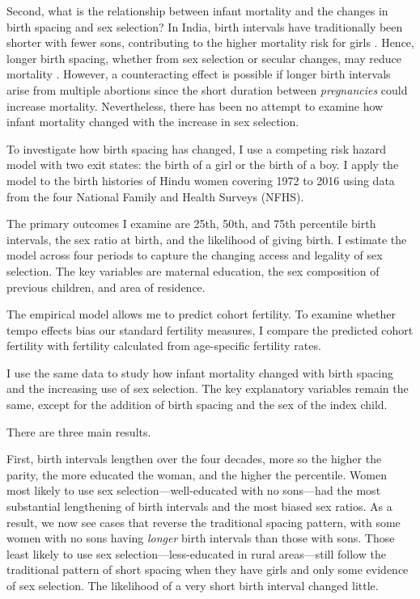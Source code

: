 \documentclass[12pt,letterpaper]{article}
\begin{document}
Second, what is the relationship between infant mortality and the changes in birth spacing 
and sex selection?
In India, birth intervals have traditionally been shorter with fewer sons, contributing 
to the higher mortality risk for girls
\citep{Whitworth2002,Bhalotra2008,Maitra2008,Jayachandran2011,Jayachandran2017a}.
Hence, longer birth spacing, whether from sex selection or secular changes, may reduce 
mortality \citep{Conde-Agudelo2012,Molitoris2019}.
However, a counteracting effect is possible if longer birth intervals arise from multiple 
abortions since the short duration between \emph{pregnancies} could increase mortality. 
Nevertheless, there has been no attempt to examine how infant mortality changed with 
the increase in sex selection.


To investigate how birth spacing has changed, I use a competing risk hazard model with 
two exit states: the birth of a girl or the birth of a boy. 
I apply the model to the birth histories of Hindu women covering 1972 to 2016 using 
data from the four National Family and Health Surveys (NFHS). 

The primary outcomes I examine are 25th, 50th, and 75th percentile birth intervals, the 
sex ratio at birth, and the likelihood of giving birth. 
I estimate the model across four periods to capture the changing access and 
legality of sex selection. 
The key variables are maternal education, the sex composition of previous 
children, and area of residence.

The empirical model allows me to predict cohort fertility. 
To examine whether tempo effects bias our standard fertility measures, I compare 
the predicted cohort fertility with fertility calculated from age-specific fertility 
rates.

I use the same data to study how infant mortality changed with birth spacing and 
the increasing use of sex selection. 
The key explanatory variables remain the same, except for the addition of birth spacing 
and the sex of the index child. 

There are three main results.

First, birth intervals lengthen over the four decades, more so the higher the parity, the 
more educated the woman, and the higher the percentile. 
Women most likely to use sex selection---well-educated with no sons---had the most 
substantial lengthening of birth intervals and the most biased sex ratios. 
As a result, we now see cases that reverse the traditional spacing pattern, with some 
women with no sons having \emph{longer} birth intervals than those with sons. 
Those least likely to use sex selection---less-educated in rural areas---still follow the 
traditional pattern of short spacing when they have girls and only some evidence of sex 
selection. 
The likelihood of a very short birth interval changed little. 
\end{document}
